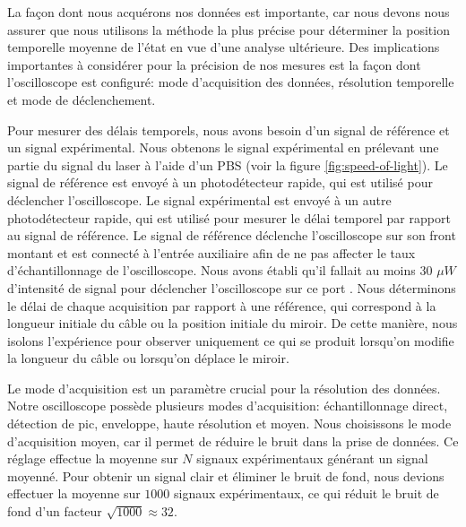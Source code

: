 \begin{onehalfspace}
    
    La façon dont nous acquérons nos données est importante, car nous 
    devons nous assurer que nous utilisons la méthode la plus précise 
    pour déterminer la position temporelle moyenne de l’état en vue
    d’une analyse ultérieure. Des implications 
    importantes à considérer pour la précision de nos mesures est la 
    façon dont l’oscilloscope est configuré:
    mode d'acquisition des données, résolution temporelle 
    et mode de déclenchement. 

    \noindent Pour mesurer des délais temporels, nous avons 
    besoin d'un signal de 
    référence et un signal expérimental. Nous obtenons le signal expérimental
    en prélevant une partie du signal du laser à l'aide d'un PBS (voir 
    la figure \ref{fig:speed-of-light}). Le signal de référence est
    envoyé à un photodétecteur rapide, qui est utilisé pour
    déclencher l'oscilloscope. Le signal expérimental est envoyé
    à un autre photodétecteur rapide, qui est utilisé pour
    mesurer le délai temporel par rapport au signal de référence. 
    Le signal de référence déclenche l'oscilloscope sur son front montant et 
    est connecté à l'entrée auxiliaire afin de ne pas affecter le taux 
    d'échantillonnage de l'oscilloscope. 
    Nous avons établi qu’il 
    fallait au moins $30$ $\mu W$ d’intensité de signal pour 
    déclencher l’oscilloscope sur ce port \cite{TektronixTDS5000}. 
    Nous déterminons le délai de chaque acquisition par rapport à 
    une référence, qui correspond à la longueur initiale du câble
    ou la position initiale du miroir. De cette manière, nous isolons 
    l’expérience pour observer uniquement ce qui se produit lorsqu'on modifie la 
    longueur du câble ou lorsqu’on déplace le miroir. 

    \noindent Le mode d'acquisition est un paramètre crucial pour la résolution
    des données. Notre oscilloscope possède plusieurs modes d'acquisition: 
    échantillonnage direct, détection 
    de pic, enveloppe, haute résolution et moyen. Nous choisissons
    le mode d'acquisition moyen, car il permet de réduire le bruit 
    dans la prise de données. Ce réglage effectue la moyenne sur $N$ 
    signaux expérimentaux générant un signal moyenné. Pour obtenir 
    un signal clair et éliminer le bruit de fond,
    nous devions effectuer la moyenne sur $1000$ signaux expérimentaux,
    ce qui réduit le bruit de fond d'un facteur $\sqrt{1000} \approx 32$.


\end{onehalfspace}
